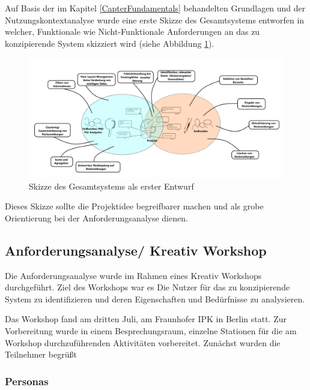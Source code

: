 Auf Basis der im Kapitel \ref{CapterFundamentals} behandelten Grundlagen und der Nutzungskontextanalyse wurde eine erste Skizze des Gesamtsystems entworfen in welcher, 
Funktionale wie Nicht-Funktionale Anforderungen an das zu konzipierende System skizziert wird (siehe Abbildung \ref{img:sysstem_sketch}).

\begin{figure}[H]
	\centering
	\includegraphics[width=1.0\textwidth]{resources/conception/skizze_gesamtsystem.png}
	\caption{Skizze des Gesamtsystems als erster Entwurf \cite{system sketch}}
	\label{img:sysstem_sketch}
\end{figure}

Dieses Skizze sollte die Projektidee begreifbarer machen und als grobe Orientierung bei der Anforderungsanalyse dienen.

\subsection{Anforderungsanalyse/ Kreativ Workshop}

Die Anforderungsanalyse wurde im Rahmen eines Kreativ Workshops durchgeführt. Ziel des Workshops war es Die Nutzer für das zu konzipierende System zu identifizieren und deren Eigenschaften und Bedürfnisse 
zu analysieren. 

Das Workshop fand am dritten Juli, am Fraunhofer IPK in Berlin statt. Zur Vorbereitung wurde in einem Besprechungsraum, einzelne Stationen für die am Workshop durchzuführenden Aktivitäten vorbereitet. 
Zunächst wurden die Teilnehmer begrüßt   
  




\subsubsection{Personas}

